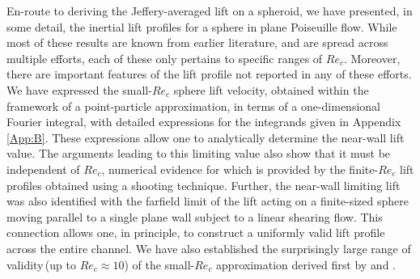 \documentclass{jfm}
\begin{document}
En-route to deriving the Jeffery-averaged lift on a spheroid, we have presented, in some detail, the inertial lift profiles for a sphere in plane Poiseuille flow. While most of these results are known from earlier literature, and are spread across multiple efforts\citep{holeal1974,vasseur1976,schonberghinch1989,asmolov1999}, each of these only pertains to specific ranges of $Re_c$. Moreover, there are important features of the lift profile not reported in any of these efforts. We have expressed the small-$Re_c$ sphere lift velocity, obtained within the framework of a point-particle approximation, in terms of a one-dimensional Fourier integral, with detailed expressions for the integrands given in Appendix \ref{App:B}. These expressions allow one to analytically determine the near-wall lift value. The arguments leading to this limiting value also show that it must be independent of $Re_c$, numerical evidence for which is provided by the finite-$Re_c$ lift profiles obtained using a shooting technique. Further, the near-wall limiting lift was also identified with the farfield limit of the lift acting on a finite-sized sphere moving parallel to a single plane wall subject to a linear shearing flow. This connection allows one, in principle, to construct a uniformly valid lift profile across the entire channel. We have also established the surprisingly large range of validity\,(up to $Re_c \approx 10$) of the small-$Re_c$ approximation derived first by \cite{holeal1974} and \cite{vasseur1976}.
\end{document}
